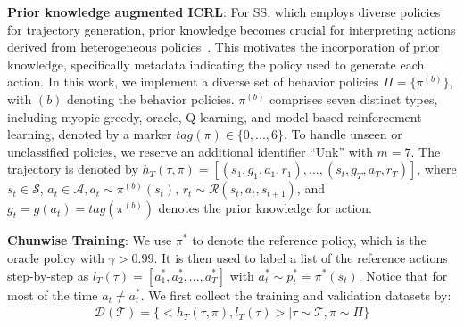 \documentclass{article}
\begin{document}
\textbf{Prior knowledge augmented ICRL}: For SS, which employs diverse policies for trajectory generation, prior knowledge becomes crucial for interpreting actions derived from heterogeneous policies~\citep{chen2021decision}. This motivates the incorporation of prior knowledge, specifically metadata indicating the policy used to generate each action. In this work, we implement a diverse set of behavior policies $\Pi=\{\pi^{(b)}\}$, with $(b)$ denoting the behavior policies. $\pi^{(b)}$ comprises seven distinct types, including myopic greedy, oracle, Q-learning, and model-based reinforcement learning, denoted by a marker $tag(\pi)\in\{0,...,6\}$. To handle unseen or unclassified policies, we reserve an additional identifier ``Unk'' with $m=7$. The trajectory is denoted by $h_{T}(\tau,\pi)=[(s_1, g_1, a_1, r_1), ..., (s_t, g_{T}, a_{T}, r_{T})]$, where $s_t \in \mathcal{S}$, $a_t \in \mathcal{A}, a_t \sim \pi^{(b)}(s_t)$, $r_t \sim \mathcal{R}(s_t,a_t, s_{t+1})$, and $g_t=g(a_t)=tag(\pi^{(b)})$ denotes the prior knowledge for action.

\textbf{Chunwise Training}: We use $\pi^*$ to denote the reference policy, which is the oracle policy with $\gamma>0.99$. It is then used to label a list of the reference actions step-by-step as $l_T(\tau)=[a^{*}_1, a^{*}_2,..., a^{*}_T]$ with $a^{*}_t \sim p^{*}_t = \pi^*(s_t)$. Notice that for most of the time $a_t \neq a^*_t$. 
We first collect the training and validation datasets by:
\begin{align}
\mathcal{D}(\mathcal{T})=\{<h_T(\tau,\pi),l_T(\tau)>| \tau \sim \mathcal{T}, \pi \sim \Pi \}
\end{align}
\end{document}
